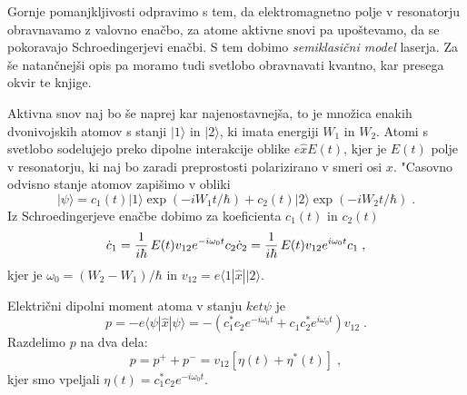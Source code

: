 Gornje pomanjkljivosti odpravimo s tem, da elektromagnetno polje v
resonatorju obravnavamo z valovno enačbo, za atome aktivne snovi pa
upoštevamo, da se pokoravajo Schroedingerjevi enačbi. S tem dobimo {\it %
semiklasični model} laserja. Za še natančnejši opis pa moramo tudi
svetlobo obravnavati kvantno, kar presega okvir te knjige.

Aktivna snov naj bo še naprej kar najenostavnejša, to je množica enakih
dvonivojskih atomov s stanji $|1\rangle$ in $|2\rangle$, ki imata energiji $%
W_1$ in $W_2$. Atomi s svetlobo sodelujejo preko dipolne interakcije oblike $%
e\hat{x}E(t)$, kjer je $E(t)$ polje v resonatorju, ki naj bo zaradi
preprostosti polarizirano v smeri osi $x$. "Casovno odvisno stanje atomov
zapišimo v obliki 
\begin{equation}  \label{5.45}
|\psi\rangle=c_1(t)|1\rangle\exp(-iW_1t/\hbar)+
c_2(t)|2\rangle\exp(-iW_2t/\hbar)\;.
\end{equation}
Iz Schroedingerjeve enačbe dobimo za koeficienta $c_1(t)$ in $c_2(t)$ 
\begin{equation}  \label{5.46}
\dot{c}_1=\frac{1}{i\hbar}\,E(t)v_{12}e^{-i\omega_0 t}c_2 \dot{c}_2=\frac{1}{%
i\hbar}\,E(t)v_{12}e^{i\omega_0 t}c_1\;,
\end{equation}
kjer je $\omega_0=(W_2-W_1)/\hbar$ in $v_{12}=e\langle 1|\hat{x}||2\rangle$.

Električni dipolni moment atoma v stanju $ket{\psi}$ je 
\begin{equation}  \label{5.47}
p=-e\langle\psi|\hat{x}|\psi\rangle=-(c_1^{\ast}c_2e^{-i \omega_0
t}+c_1c_2^{\ast}e^{i \omega_0 t}) v_{12}\;.
\end{equation}
Razdelimo $p$ na dva dela: 
\begin{equation}  \label{5.48}
p=p^++p^-=v_{12}[\eta(t)+\eta^{\ast}(t)]\;,
\end{equation}
kjer smo vpeljali $\eta(t)=c_1^{\ast}c_2e^{-i \omega_0 t}$.

